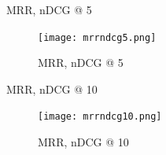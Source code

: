 \documentclass{beamer}
\begin{document}
\begin{frame}{MRR, nDCG @ 5}
\begin{figure}
        \texttt{[image: mrrndcg5.png]}
        \caption{MRR, nDCG @ 5}
    \label{fig1}
\end{figure}
\end{frame}

\begin{frame}{MRR, nDCG @ 10}
\begin{figure}
        \texttt{[image: mrrndcg10.png]}
        \caption{MRR, nDCG @ 10}
    \label{fig1}
\end{figure}
\end{frame}
\fi
\end{document}
